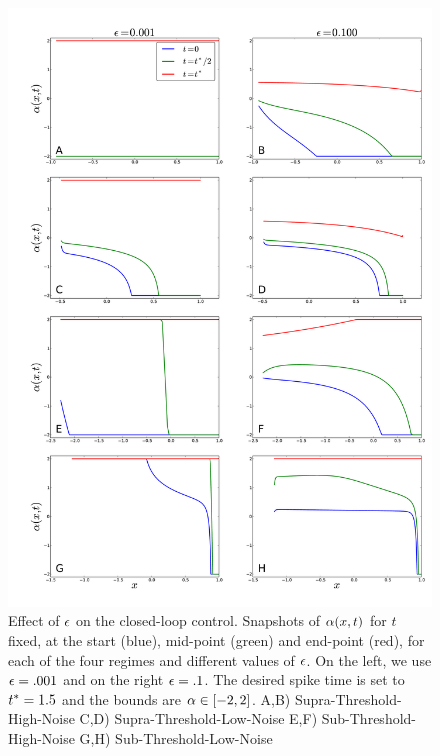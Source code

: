 \documentclass[12pt]{iopart}
\begin{document}
\begin{figure}[htp]
\begin{center}
  \includegraphics[width=.99\textwidth]{Figs/HJB/Regimes_eps_comparison.pdf}
  \caption[labelInTOC]{Effect of ${\epsilon}$ on the closed-loop control. Snapshots of
  ${\alpha}(x,t)$ for $t$ fixed, at the start (blue), mid-point (green) and end-point
  (red), for each of the four regimes and different values of ${\epsilon}$.
  On the left, we use ${\epsilon} = .001$ and on the right ${\epsilon} = .1$.
  The desired spike time is set to
  ${ t^* }=1.5$ and the bounds are ${\alpha} \in [-2,2]$.
  A,B) Supra-Threshold-High-Noise C,D) Supra-Threshold-Low-Noise
  E,F) Sub-Threshold-High-Noise G,H) Sub-Threshold-Low-Noise}
\label{fig:HJB_4regimes_control_different_eps}
\end{center}
\end{figure}
\end{document}
